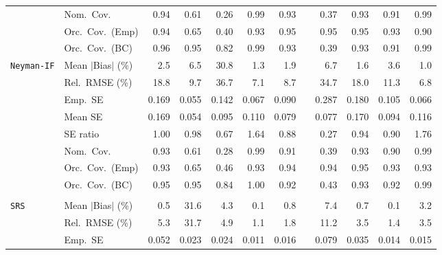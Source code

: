 \begin{landscape}
\begin{longtable}{llrrrrrrrrrr}
 & Nom.\ Cov. & \cellcolor{rankone}0.94 & 0.61 & 0.26 & 0.99 & \cellcolor{ranktwo}0.93 &  & 0.37 & \cellcolor{rankthree}0.93 & 0.91 & 0.99 \\
 & Orc.\ Cov.\ (Emp) & 0.94 & 0.65 & 0.40 & 0.93 & \cellcolor{rankthree}0.95 &  & \cellcolor{rankone}0.95 & \cellcolor{ranktwo}0.95 & 0.93 & 0.90 \\
 & Orc.\ Cov.\ (BC) & \cellcolor{ranktwo}0.96 & \cellcolor{rankone}0.95 & 0.82 & 0.99 & 0.93 &  & 0.39 & \cellcolor{rankthree}0.93 & 0.91 & 0.99 \\
\addlinespace[2pt]
\quad \texttt{Neyman-IF} & Mean $|$Bias$|$ (\%) & 2.5 & 6.5 & 30.8 & \cellcolor{ranktwo}1.3 & 1.9 &  & 6.7 & \cellcolor{rankthree}1.6 & 3.6 & \cellcolor{rankone}1.0 \\
 & Rel.\ RMSE (\%) & 18.8 & 9.7 & 36.7 & \cellcolor{ranktwo}7.1 & \cellcolor{rankthree}8.7 &  & 34.7 & 18.0 & 11.3 & \cellcolor{rankone}6.8 \\
 & Emp.\ SE & 0.169 & 0.055 & 0.142 & 0.067 & 0.090 &  & 0.287 & 0.180 & 0.105 & 0.066 \\
 & Mean SE & 0.169 & 0.054 & 0.095 & 0.110 & 0.079 &  & 0.077 & 0.170 & 0.094 & 0.116 \\
 & SE ratio & \cellcolor{rankone}1.00 & \cellcolor{ranktwo}0.98 & 0.67 & 1.64 & 0.88 &  & 0.27 & \cellcolor{rankthree}0.94 & 0.90 & 1.76 \\
 & Nom.\ Cov. & \cellcolor{rankone}0.93 & 0.61 & 0.28 & 0.99 & \cellcolor{rankthree}0.91 &  & 0.39 & \cellcolor{ranktwo}0.93 & 0.90 & 0.99 \\
 & Orc.\ Cov.\ (Emp) & 0.93 & 0.65 & 0.46 & 0.93 & \cellcolor{ranktwo}0.94 &  & \cellcolor{rankthree}0.94 & \cellcolor{rankone}0.95 & 0.93 & 0.93 \\
 & Orc.\ Cov.\ (BC) & \cellcolor{ranktwo}0.95 & \cellcolor{rankone}0.95 & 0.84 & 1.00 & 0.92 &  & 0.43 & \cellcolor{rankthree}0.93 & 0.92 & 0.99 \\
\addlinespace[2pt]
\multicolumn{12}{l}{\textbf{Continuous Phase-One Covariates}} \\
\addlinespace[2pt]
\quad \texttt{SRS} & Mean $|$Bias$|$ (\%) & \cellcolor{rankthree}0.5 & 31.6 & 4.3 & \cellcolor{ranktwo}0.1 & 0.8 &  & 7.4 & 0.7 & \cellcolor{rankone}0.1 & 3.2 \\
 & Rel.\ RMSE (\%) & 5.3 & 31.7 & 4.9 & \cellcolor{rankone}1.1 & \cellcolor{rankthree}1.8 &  & 11.2 & 3.5 & \cellcolor{ranktwo}1.4 & 3.5 \\
 & Emp.\ SE & 0.052 & 0.023 & 0.024 & 0.011 & 0.016 &  & 0.079 & 0.035 & 0.014 & 0.015 \\

\end{longtable}
\end{landscape}
